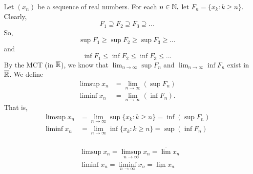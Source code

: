 \begin{definition}
    \label{limsup2}
    Let $(x_n)$ be a sequence of real numbers. For each $n \in \mathbb{N},$ let $F_n = \{x_k : k \geq n \}.$
    Clearly,
    $$F_1 \supseteq F_2 \supseteq F_3 \supseteq ...$$
    So,
    $$ \sup F_1 \geq \sup F_2 \geq \sup F_3 \geq ...$$
    and
    $$ \inf F_1 \leq \inf F_2 \leq \inf F_3 \leq ...$$
    By the MCT (in $\overline{\mathbb{R}}$), we know that $\lim_{n \to \infty} \sup F_n$ and $\lim_{n \to \infty} \inf F_n$ exist in $\overline{\mathbb{R}}$. We define
    \begin{align*}
        \limsup x_n &= \lim_{n \to \infty}(\sup F_n) \\
        \liminf x_n &= \lim_{n \to \infty}(\inf F_n).
    \end{align*}
    That is,
    \begin{align*}
        \limsup x_n &= \lim_{n \to \infty}\sup \{x_k : k \geq n\} = \inf (\sup F_n) \\
        \liminf x_n &= \lim_{n \to \infty}\inf \{x_k : k \geq n\} = \sup (\inf F_n) \\
    \end{align*}
\end{definition}

\begin{notation}
    \begin{align*}
        &\limsup x_n = \limsup \limits_{n \to \infty}x_n = \overline{\lim}x_n \\
        &\liminf x_n = \liminf \limits_{n \to \infty}x_n = \underline{\lim}x_n \\
    \end{align*}
\end{notation}

